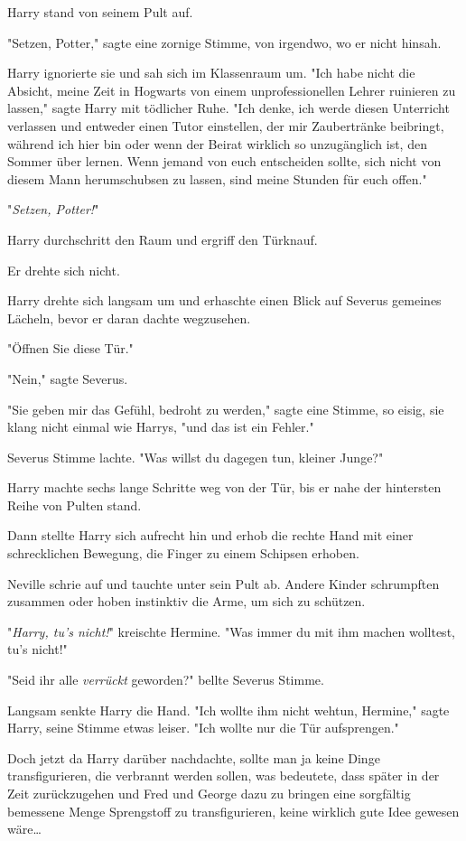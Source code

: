 {Harry stand von seinem Pult auf.

"Setzen, Potter," sagte eine zornige Stimme, von irgendwo, wo er nicht hinsah.

Harry ignorierte sie und sah sich im Klassenraum um. "Ich habe nicht die Absicht, meine Zeit in Hogwarts von einem unprofessionellen Lehrer ruinieren zu lassen," sagte Harry mit tödlicher Ruhe. "Ich denke, ich werde diesen Unterricht verlassen und entweder einen Tutor einstellen, der mir Zaubertränke beibringt, während ich hier bin oder wenn der Beirat wirklich so unzugänglich ist, den Sommer über lernen. Wenn jemand von euch entscheiden sollte, sich nicht von diesem Mann herumschubsen zu lassen, sind meine Stunden für euch offen."

"\emph{Setzen, Potter!}"

Harry durchschritt den Raum und ergriff den Türknauf.

Er drehte sich nicht.

Harry drehte sich langsam um und erhaschte einen Blick auf Severus gemeines Lächeln, bevor er daran dachte wegzusehen.

"Öffnen Sie diese Tür."

"Nein," sagte Severus.

"Sie geben mir das Gefühl, bedroht zu werden," sagte eine Stimme, so eisig, sie klang nicht einmal wie Harrys, "und das ist ein Fehler."

Severus Stimme lachte. "Was willst du dagegen tun, kleiner Junge?"

Harry machte sechs lange Schritte weg von der Tür, bis er nahe der hintersten Reihe von Pulten stand.

Dann stellte Harry sich aufrecht hin und erhob die rechte Hand mit einer schrecklichen Bewegung, die Finger zu einem Schipsen erhoben.

Neville schrie auf und tauchte unter sein Pult ab. Andere Kinder schrumpften zusammen oder hoben instinktiv die Arme, um sich zu schützen.

"\emph{Harry, tu's nicht!}" kreischte Hermine. "Was immer du mit ihm machen wolltest, tu's nicht!"

"Seid ihr alle \emph{verrückt} geworden?" bellte Severus Stimme.

Langsam senkte Harry die Hand. "Ich wollte ihm nicht wehtun, Hermine," sagte Harry, seine Stimme etwas leiser. "Ich wollte nur die Tür aufsprengen."

Doch jetzt da Harry darüber nachdachte, sollte man ja keine Dinge transfigurieren, die verbrannt werden sollen, was bedeutete, dass später in der Zeit zurückzugehen und Fred und George dazu zu bringen eine sorgfältig bemessene Menge Sprengstoff zu transfigurieren, keine wirklich gute Idee gewesen wäre…

}
